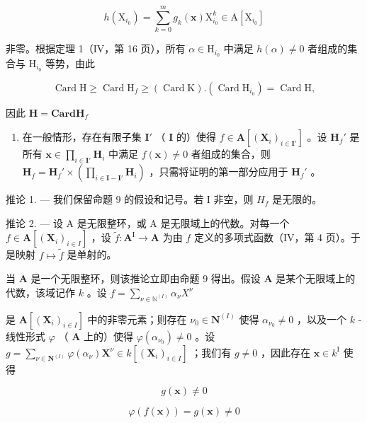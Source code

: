 \[
h \left(\mathrm{X} _ {i _ {0}}\right) = \sum_ {k = 0} ^ {m} g _ {k} (\mathbf {x}) \mathrm{X} _ {i _ {0}} ^ {k} \in \mathrm{A} \left[ \mathrm{X} _ {i _ {0}} \right]
\]

非零。根据定理 1（IV，第 16 页），所有 \(\alpha \in \mathrm{H}_{i_0}\) 中满足 \(h(\alpha) \neq 0\) 者组成的集合与 \(\mathrm{H}_{i_0}\) 等势，由此

\[
\operatorname{Card} \mathrm{H} \geqslant \operatorname{Card} \mathrm{H} _ {f} \geqslant (\operatorname{Card} \mathrm{K}). (\operatorname{Card} \mathrm{H} _ {i _ {0}}) = \operatorname{Card} \mathrm{H},
\]

因此 \(\mathbf{H} = \mathbf{Card}\mathbf{H}_f\)

\begin{enumerate}
\def\labelenumi{\alph{enumi})}
\setcounter{enumi}{1}
\tightlist
\item
  在一般情形，存在有限子集 \(\mathbf{I}'\) （ \(\mathbf{I}\) 的）使得 \(f \in \mathbf{A}[(\mathbf{X}_i)_{i \in \mathbf{I}'}]\) 。设 \(\mathbf{H}_f'\) 是所有 \(\mathbf{x} \in \prod_{i \in \mathbf{I}'} \mathbf{H}_i\) 中满足 \(f(\mathbf{x}) \neq 0\) 者组成的集合，则 \(\mathbf{H}_f = \mathbf{H}_f' \times \left( \prod_{i \in \mathbf{I} - \mathbf{I}'} \mathbf{H}_i \right)\) ，只需将证明的第一部分应用于 \(\mathbf{H}_f'\) 。
\end{enumerate}

推论 1. --- 我们保留命题 9 的假设和记号。若 I 非空，则 \(H_{f}\) 是无限的。

推论 2. --- 设 A 是无限整环，或 A 是无限域上的代数。对每一个 \(f \in \mathbf{A}[(\mathbf{X}_i)_{i \in I}]\) ，设 \(\tilde{f}: \mathbf{A}^{\mathrm{I}} \to \mathbf{A}\) 为由 \(f\) 定义的多项式函数（IV，第 4 页）。于是映射 \(f \mapsto \tilde{f}\) 是单射的。

当 \(\mathbf{A}\) 是一个无限整环，则该推论立即由命题 9 得出。假设 \(\mathbf{A}\) 是某个无限域上的代数，该域记作 \(k\) 。设 \(f = \sum_{\nu \in \mathbb{N}^{(I)}} \alpha_{\nu} X^{\nu}\)

是 \(\mathbf{A}[(\mathbf{X}_i)_{i\in I}]\) 中的非零元素；则存在 \(\nu_0\in \mathbf{N}^{(I)}\) 使得 \(\alpha_{\nu_0}\neq 0\) ，以及一个 \(k\) -线性形式 \(\varphi\) （ \(\mathbf{A}\) 上的）使得 \(\varphi (\alpha_{\nu_0})\neq 0\) 。设 \(g = \sum_{\nu \in \mathbf{N}^{(I)}}\varphi (\alpha_{\nu})\mathbf{X}^{\nu}\in k[(\mathbf{X}_i)_{i\in I}]\) ；我们有 \(g\neq 0\) ，因此存在 \(\mathbf{x}\in k^{\mathrm{I}}\) 使得

\[
g (\mathbf {x}) \neq 0
\]

\[
\varphi (f (\mathbf {x})) = g (\mathbf {x}) \neq 0
\]

